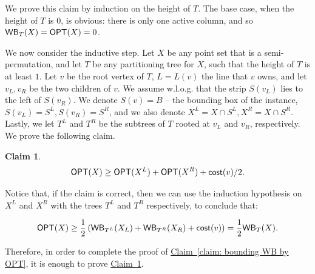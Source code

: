 \documentclass[11pt]{article}
\numberwithin{equation}{section}
\newtheorem{claim}[theorem]{Claim}
\theoremstyle{definition}
\theoremstyle{plain}
\newcommand{\expref}[2]{\hyperref[#2]{#1~\ref{#2}}}
\begin{document}
We prove this claim by induction on the height of $T$. 
The base case, when the height of $T$ is $0$, is obvious: there is only one active column, and so $\mathsf{WB}_T(X) = \mbox{\sf OPT}(X) = 0$. 



We now consider the inductive step.
Let $X$ be any point set that is a semi-permutation, and let $T$ be any partitioning tree for $X$, such that the height of $T$ is at least $1$. Let $v$ be the root vertex of $T$, $L=L(v)$ the line that $v$ owns, and let $v_L,v_R$ be the two children of $v$. We assume w.l.o.g. that 
the strip $S(v_L)$ lies to the left of $S(v_R)$. We denote $S(v)=B$ -- the bounding box of the instance, $S(v_L)=S^L,S(v_R)=S^R$, and we also denote $X^L=X\cap S^L,X^R=X\cap S^R$. Lastly, we let $T^L$ and $T^R$ be the subtrees of $T$ rooted at $v_L$ and $v_R$, respectively.
We prove the following claim.

\begin{claim}\label{claim: ind step}
	\[\mbox{\sf OPT}(X)\geq \mbox{\sf OPT}(X^L)+\mbox{\sf OPT}(X^R)+\mathsf{cost}(v)/2.\]
	\end{claim}

Notice that, if the claim is correct, then we can use the induction hypothesis on $X^L$ and $X^R$ with the trees $T^L$ and $T^R$ respectively, to conclude that:

\[\mbox{\sf OPT}(X)\geq \frac{1}{2} \left(\mathsf{WB}_{T^L}(X_L)+\mathsf{WB}_{T^R}(X_R)+\mathsf{cost}(v)\right )=\frac{1}{2} \mathsf{WB}_T(X).\]

Therefore, in order to complete the proof of \expref{Claim}{claim: bounding WB by OPT}, it is enough to prove \expref{Claim}{claim: ind step}.
\end{document}
